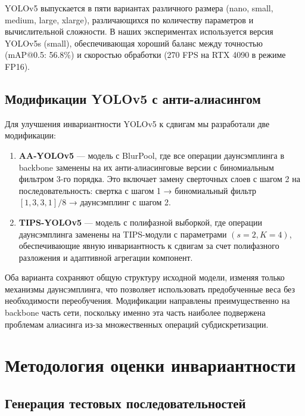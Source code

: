 YOLOv5 выпускается в пяти вариантах различного размера (nano, small, medium, large, xlarge), различающихся по количеству параметров и вычислительной сложности. В наших экспериментах используется версия YOLOv5s (small), обеспечивающая хороший баланс между точностью (mAP@0.5: 56.8\%) и скоростью обработки (270 FPS на RTX 4090 в режиме FP16).

\subsection{Модификации YOLOv5 с анти-алиасингом}
\label{methods:yolov5:modifications}

Для улучшения инвариантности YOLOv5 к сдвигам мы разработали две модификации:

\begin{enumerate}
    \item \textbf{AA-YOLOv5} — модель с BlurPool, где все операции даунсэмплинга в backbone заменены на их анти-алиасинговые версии с биномиальным фильтром 3-го порядка. Это включает замену сверточных слоев с шагом 2 на последовательность: свертка с шагом 1 → биномиальный фильтр $[1, 3, 3, 1]/8$ → даунсэмплинг с шагом 2.
    
    \item \textbf{TIPS-YOLOv5} — модель с полифазной выборкой, где операции даунсэмплинга заменены на TIPS-модули с параметрами $(s=2, K=4)$, обеспечивающие явную инвариантность к сдвигам за счет полифазного разложения и адаптивной агрегации компонент.
\end{enumerate}

Оба варианта сохраняют общую структуру исходной модели, изменяя только механизмы даунсэмплинга, что позволяет использовать предобученные веса без необходимости переобучения. Модификации направлены преимущественно на backbone часть сети, поскольку именно эта часть наиболее подвержена проблемам алиасинга из-за множественных операций субдискретизации.

\section{Методология оценки инвариантности}
\label{methods:evaluation}

\subsection{Генерация тестовых последовательностей}
\label{methods:evaluation:sequences}

